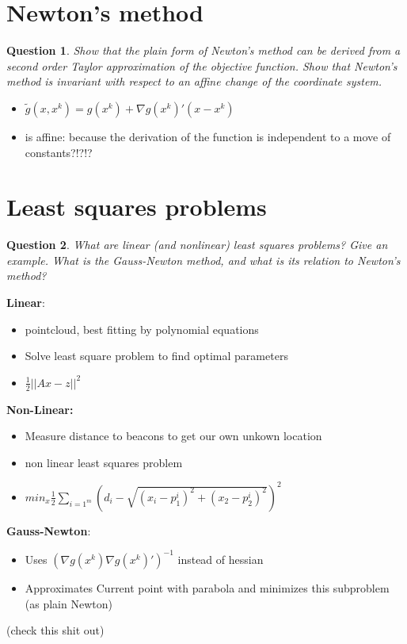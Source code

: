\documentclass{article}
\newtheorem{question}{Question}
\begin{document}
\section{Newton's method}

\begin{question}
  Show that the plain form of Newton’s method can be derived from a second order Taylor
  approximation of the objective function. Show that Newton’s method is invariant with respect to an
  affine change of the coordinate system.
\end{question}
\begin{itemize}
\item $\tilde{g}(x, x^k) = g(x^k) + \nabla g(x^k)'(x - x^k)$
\item is affine: because the derivation of the function is independent to a move of constants?!?!?
\end{itemize}

\section{Least squares problems}

\begin{question}
  What are linear (and nonlinear) least squares problems? Give an example.  What is the Gauss-Newton
  method, and what is its relation to Newton’s method?
\end{question}
\textbf{Linear}:
\begin{itemize}
\item pointcloud, best fitting by polynomial equations
\item Solve least square problem to find optimal parameters
\item $\frac{1}{2}|| Ax - z ||^2$
\end{itemize} 
\textbf{Non-Linear:}
\begin{itemize}
\item Measure distance to beacons to get our own unkown location
\item non linear least squares problem
\item $min_x \frac{1}{2} \sum_{i = 1^m} (d_i - \sqrt{(x_i - p_1^i)^2 + (x_2 - p_2^i)^2})^2$
\end{itemize} 
\textbf{Gauss-Newton}:
\begin{itemize}
\item Uses $(\nabla g(x^k)\nabla g(x^k)')^{-1}$ instead of hessian
\item Approximates Current point with parabola and minimizes this subproblem (as plain Newton)
\end{itemize}
(check this shit out)
\end{document}
